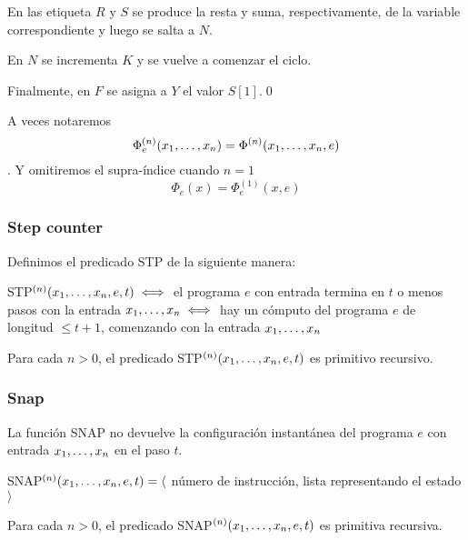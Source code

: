 \begin{demoPart}

En las etiqueta $R$ y $S$ se produce la resta y suma, respectivamente, de la variable correspondiente y luego se salta a $N$.

En $N$ se incrementa $K$ y se vuelve a comenzar el ciclo.

Finalmente, en $F$ se asigna a $Y$ el valor $S[1]$.\qed
\end{demoPart}

A veces notaremos $$\Phi^{(n)}_e(x_1,\dots, x_{n}) = \Phi^{(n)}(x_1,\dots, x_{n},e)$$. Y omitiremos el supra-índice cuando $n=1$
$$\Phi_e(x) = \Phi_e^{(1)}(x,e)$$


\subsubsection{Step counter}

Definimos el predicado STP de la siguiente manera:

STP$^{(n)}(x_1,\dots, x_{n}, e,t) \iff$ el programa $e$ con entrada termina en $t$ o menos pasos con la entrada $x_1,\dots, x_{n} \iff$ hay un cómputo del programa $e$ de longitud $\leq t+1$, comenzando con la entrada $x_1,\dots, x_{n}$

\begin{teorema}
	Para cada $n > 0$, el predicado STP$^{(n)}(x_1,\dots, x_{n}, e, t)$ es primitivo recursivo.
\end{teorema}

\subsubsection{Snap}
La función SNAP no devuelve la configuración instantánea del programa $e$ con entrada $x_1,\dots, x_{n}$ en el paso $t$.

SNAP$^{(n)}(x_1,\dots, x_{n}, e,t) = \langle$ número de instrucción, lista representando el estado $\rangle$ 

\begin{teorema}
	Para cada $n > 0$, el predicado SNAP$^{(n)}(x_1,\dots, x_{n}, e, t)$ es primitiva recursiva.
\end{teorema}

